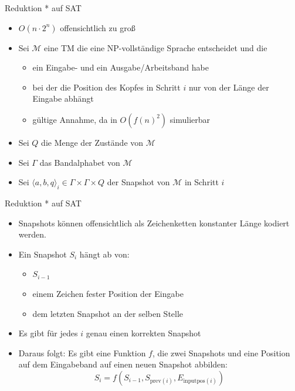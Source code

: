 \documentclass[ignorenonframetext,]{beamer}
\begin{document}
\begin{frame}{Reduktion * auf SAT}

\begin{itemize}
\itemsep1pt\parskip0pt
\item
  $O(n \cdot 2^n)$ offensichtlich zu groß
\item
  Sei $\mathcal{M}$ eine TM die eine NP-vollständige Sprache entscheidet
  und die

  \begin{itemize}
  \itemsep1pt\parskip0pt
  \item
    ein Eingabe- und ein Ausgabe/Arbeitsband habe
  \item
    bei der die Position des Kopfes in Schritt $i$ nur von der Länge der
    Eingabe abhängt
  \item
    gültige Annahme, da in $O(f(n)^2)$ simulierbar
  \end{itemize}
\item
  Sei $Q$ die Menge der Zustände von $\mathcal{M}$
\item
  Sei $\Gamma$ das Bandalphabet von $\mathcal{M}$
\item
  Sei $\langle a, b, q\rangle_i \in \Gamma\times \Gamma\times Q$ der
  Snapshot von $\mathcal{M}$ in Schritt $i$
\end{itemize}

\end{frame}

\begin{frame}{Reduktion * auf SAT}

\begin{itemize}
\itemsep1pt\parskip0pt
\item
  Snapshots können offensichtlich als Zeichenketten konstanter Länge
  kodiert werden.
\item
  Ein Snapshot $S_i$ hängt ab von:

  \begin{itemize}
  \itemsep1pt\parskip0pt
  \item
    $S_{i-1}$
  \item
    einem Zeichen fester Position der Eingabe
  \item
    dem letzten Snapshot an der selben Stelle
  \end{itemize}
\item
  Es gibt für jedes $i$ genau einen korrekten Snapshot
\item
  Daraus folgt: Es gibt eine Funktion $f$, die zwei Snapshots und eine
  Position auf dem Eingabeband auf einen neuen Snapshot abbilden:
  \[S_i = f(S_{i-1}, S_{\mathrm{prev}(i)}, E_{\mathrm{inputpos}(i)})\]
\end{itemize}

\end{frame}
\end{document}
